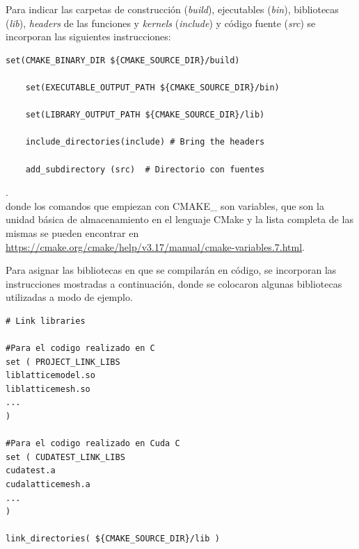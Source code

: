 Para indicar las carpetas de construcción (\textit{build}), ejecutables (\textit{bin}), bibliotecas (\textit{lib}), \textit{headers} de las funciones y \textit{kernels} (\textit{include}) y código fuente (\textit{src}) se incorporan las siguientes instrucciones:
{\footnotesize
	\begin{frame}{}
		\begin{lstlisting}[frame=single]
	set(CMAKE_BINARY_DIR ${CMAKE_SOURCE_DIR}/build)

	set(EXECUTABLE_OUTPUT_PATH ${CMAKE_SOURCE_DIR}/bin)

	set(LIBRARY_OUTPUT_PATH ${CMAKE_SOURCE_DIR}/lib)

	include_directories(include) # Bring the headers
	
	add_subdirectory (src) 	# Directorio con fuentes

		\end{lstlisting}
		
	\end{frame}
}.
\\
donde los comandos que empiezan con \textsc{CMAKE\_} son variables, que son la unidad básica de almacenamiento en el lenguaje CMake y la lista completa de las mismas se pueden encontrar en \url{https://cmake.org/cmake/help/v3.17/manual/cmake-variables.7.html}.


Para asignar las bibliotecas en que se compilarán en código, se incorporan las instrucciones mostradas a continuación, donde se colocaron algunas bibliotecas utilizadas a modo de ejemplo.
\newpage
{\footnotesize
	\begin{frame}{}
		\begin{lstlisting}[frame=single]
# Link libraries

#Para el codigo realizado en C
set ( PROJECT_LINK_LIBS 
liblatticemodel.so 		
liblatticemesh.so
...
)

#Para el codigo realizado en Cuda C
set ( CUDATEST_LINK_LIBS 
cudatest.a
cudalatticemesh.a
...
)

link_directories( ${CMAKE_SOURCE_DIR}/lib )
		
		\end{lstlisting}
		
	\end{frame}
}


